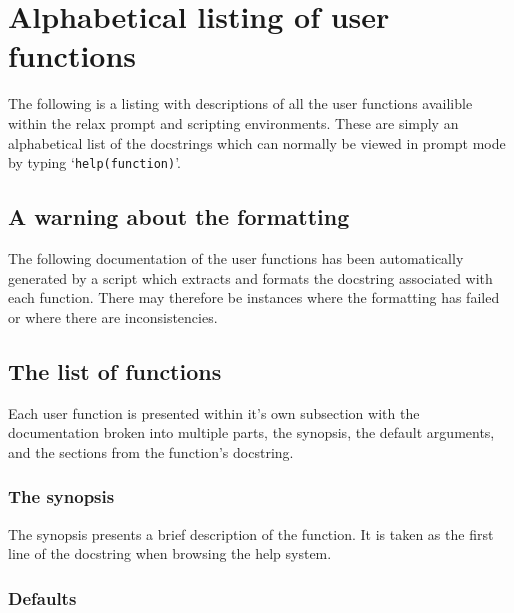 
\chapter{Alphabetical listing of user functions}

The following is a listing with descriptions of all the user functions  availible within the relax prompt and scripting environments.  These are simply an alphabetical list of the docstrings which can normally be viewed in prompt mode by typing `\texttt{help(function)}'.





\section{A warning about the formatting}

The following documentation of the user functions  has been automatically generated by a script which extracts and formats the docstring associated with each function.  There may therefore be instances where the formatting has failed or where there are inconsistencies.




\section{The list of functions}

Each user function  is presented within it's own subsection with the documentation broken into multiple parts, the synopsis, the default arguments, and the sections from the function's docstring.


\subsection{The synopsis}

The synopsis presents a brief description of the function.  It is taken as the first line of the docstring when browsing the help system.


\subsection{Defaults}

